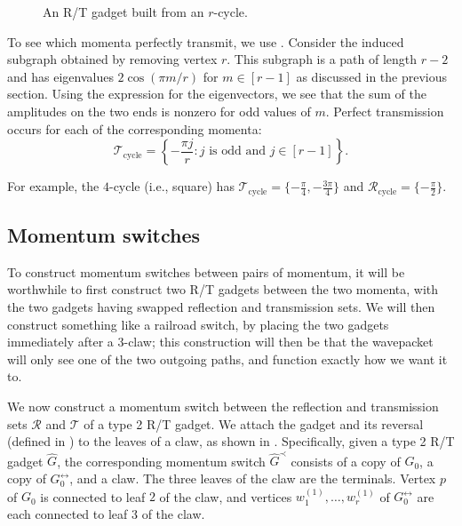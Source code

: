 \documentclass[../thesis-main/thesis-main]{subfiles}
\begin{document}
\begin{figure}
  \centering
  
  \caption{An R/T gadget built from an $r$-cycle.}
  \label{fig:RT_cycle}
\end{figure}


To see which momenta perfectly transmit, we use . Consider the induced subgraph obtained by removing vertex $r$. This subgraph is a path of length $r-2$ and has eigenvalues $2\cos(\pi m/r)$ for $m \in [r-1]$ as discussed in the previous section. Using the expression  for the eigenvectors, we see that the sum of the amplitudes on the two ends is nonzero for odd values of $m$.  Perfect transmission occurs for each of the corresponding momenta:  
\[
  \mathcal{T}_{\mathrm{cycle}} = \left\{ -\frac{\pi j}{r} \colon \text{$j$ is odd and $j\in [r-1]$}\right\}.
\]

For example, the $4$-cycle (i.e., square) has $\mathcal{T}_{\mathrm{cycle}} = \{-\frac{\pi}{4},-\frac{3\pi}{4}\}$ and $\mathcal{R}_{\mathrm{cycle}} = \{-\frac{\pi}{2}\}$.  



\subsection{Momentum switches}


To construct momentum switches between pairs of momentum, it will be worthwhile to first construct two R/T gadgets between the two momenta, with the two gadgets having swapped reflection and transmission sets.  We will then construct something like a railroad switch, by placing the two gadgets immediately after a 3-claw; this construction will then be that the wavepacket will only see one of the two outgoing paths, and function exactly how we want it to.


We now construct a momentum switch between the reflection and transmission sets $\mathcal{R}$ and $\mathcal{T}$ of a type 2 R/T gadget.  We attach the gadget and its reversal (defined in ) to the leaves of a claw, as shown in .  Specifically, given a type 2 R/T gadget $\hat{G}$, the corresponding momentum switch $\hat{G}^{\prec}$ consists of a copy of $G_0$, a copy of $G_{0}^{\leftrightarrow}$, and a claw.  The three leaves of the claw are the terminals.  Vertex $p$ of $G_0$ is connected to leaf $2$ of the claw, and vertices $w_1^{(1)},\ldots,w_r^{(1)}$ of $G_{0}^{\leftrightarrow}$ are each connected to leaf $3$ of the claw.
\end{document}
